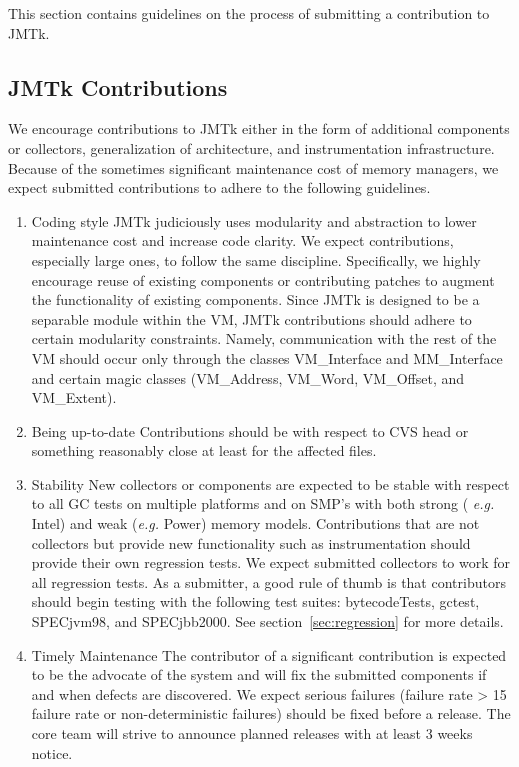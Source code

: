 This section contains guidelines on the process of
submitting a contribution to JMTk.


\subsection{JMTk Contributions}

We encourage contributions to JMTk either in the form of additional
components or collectors, generalization of architecture,
and instrumentation infrastructure.  Because of the sometimes significant
maintenance cost of memory managers, we expect submitted contributions
to adhere to the following guidelines.


\begin{enumerate}

\item{Coding style}  
JMTk judiciously uses modularity and abstraction to lower maintenance
cost and increase code clarity.  We expect contributions, especially
large ones, to follow the same discipline.  Specifically, we highly
encourage reuse of existing components or contributing patches to
augment the functionality of existing components.  Since JMTk is
designed to be a separable module within the VM, JMTk contributions
should adhere to certain modularity constraints.  Namely,
communication with the rest of the VM should occur only through the
classes VM_Interface and MM_Interface and certain magic classes
(VM_Address, VM_Word, VM_Offset, and VM_Extent).

\item{Being up-to-date}  
Contributions should be with respect to CVS head or something
reasonably close at least for the affected files.

\item{Stability}  
New collectors or components are expected to be stable with respect to
all GC tests on multiple platforms and on SMP's with both strong ({\it
e.g.} Intel) and weak ({\it e.g.} Power) memory models.  Contributions
that are not collectors but provide new functionality such as
instrumentation should provide their own regression tests.
We expect submitted collectors to work for all regression tests.
As a submitter, a good rule of thumb is that contributors should begin
testing with the following test suites: bytecodeTests, gctest, 
SPECjvm98\trademark, and SPECjbb2000\trademark.  See section~\ref{sec:regression}
for more details.

\item{Timely Maintenance}  
The contributor of a significant contribution is expected to be the
advocate of the system and will fix the submitted components if and
when defects are discovered.  We expect serious failures (failure rate
> 15%
failure rate or non-deterministic failures) should be fixed before a
release.  The core team will strive to announce planned releases with
at least 3 weeks notice.


\end{enumerate}
